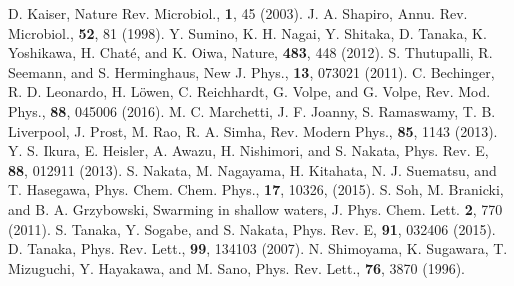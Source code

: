 \documentclass[showpacs]{revtex4-1}
\begin{document}
\begin{thebibliography}{99}
  D. Kaiser, Nature Rev. Microbiol., {\bf 1}, 45 (2003).
  J. A. Shapiro, Annu. Rev. Microbiol., {\bf 52},
	 81 (1998).
  Y. Sumino, K. H. Nagai, Y. Shitaka, D. Tanaka,
	 K. Yoshikawa, H. Chat\'{e}, and K. Oiwa, Nature, {\bf 483}, 448 (2012).
  S. Thutupalli, R. Seemann, and S. Herminghaus,
	 New J. Phys., {\bf 13}, 073021 (2011).
  C. Bechinger, R. D. Leonardo, H. L\"{o}wen,
	 C. Reichhardt, G. Volpe, and G. Volpe, Rev. Mod. Phys., {\bf
	 88}, 045006 (2016).
  M. C. Marchetti, J. F. Joanny, S. Ramaswamy,
	 T. B. Liverpool, J. Prost, M. Rao, R. A. Simha, Rev. Modern
	 Phys., {\bf 85}, 1143 (2013).
  Y. S. Ikura, E. Heisler, A. Awazu, H. Nishimori, and
	 S. Nakata, Phys. Rev. E, {\bf 88}, 012911 (2013).
  S. Nakata, M. Nagayama, H. Kitahata,
	 N. J. Suematsu, and T. Hasegawa, Phys. Chem. Chem. Phys., {\bf 17},
	 10326, (2015). 
  S. Soh, M. Branicki, and B. A. Grzybowski, Swarming
	 in shallow waters, J. Phys. Chem. Lett. {\bf 2}, 770 (2011).
  S. Tanaka, Y. Sogabe, and S. Nakata, Phys. Rev. E,
	 {\bf 91}, 032406 (2015).
  D. Tanaka, Phys. Rev. Lett., {\bf 99}, 134103 (2007).
  N. Shimoyama, K. Sugawara, T. Mizuguchi,
	 Y. Hayakawa, and M. Sano, Phys. Rev. Lett., {\bf 76}, 3870
	 (1996).
\end{thebibliography}
\end{document}
